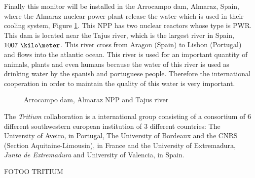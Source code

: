 Finally this monitor will be installed in the Arrocampo dam, Almaraz, Spain, where the Almaraz nuclear power plant release the water which is used in their cooling system, Figure \ref{fig:Arrocampo}. This NPP has two nuclear reactors whose type is PWR. This dam is located near the Tajus river, which is the largest river in Spain, $1007~\kilo\meter$. This river cross from Aragon (Spain) to Lisbon (Portugal) and flows into the atlantic ocean. This river is used for an important quantity of animals, plants and even humans because the water of this river is used as drinking water by the spanish and portuguese people. Therefore the international cooperation in order to maintain the quality of this water is very important.

\begin{figure}[hbtp]
 \centering
 \caption{Arrocampo dam, Almaraz NPP and Tajus river}
 \label{fig:Arrocampo}
\end{figure}

The \textit{Tritium} collaboration is a international group consisting of a consortium of 6 different southwestern european institution of 3 different countries: The University of Aveiro, in Portugal, The University of Bordeaux and the CNRS  (Section Aquitaine-Limousin), in France and the University of Extremadura, \textit{Junta de Extremadura} and University of Valencia, in Spain.

FOTOO TRITIUM

